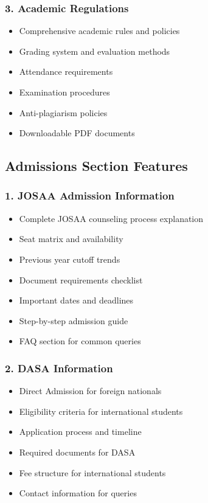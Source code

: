\documentclass[12pt,a4paper]{report}
\begin{document}
\subsubsection*{3. Academic Regulations}
\begin{itemize}
    \item Comprehensive academic rules and policies
    \item Grading system and evaluation methods
    \item Attendance requirements
    \item Examination procedures
    \item Anti-plagiarism policies
    \item Downloadable PDF documents
\end{itemize}

\subsection{Admissions Section Features}

\subsubsection*{1. JOSAA Admission Information}
\begin{itemize}
    \item Complete JOSAA counseling process explanation
    \item Seat matrix and availability
    \item Previous year cutoff trends
    \item Document requirements checklist
    \item Important dates and deadlines
    \item Step-by-step admission guide
    \item FAQ section for common queries
\end{itemize}

\subsubsection*{2. DASA Information}
\begin{itemize}
    \item Direct Admission for foreign nationals
    \item Eligibility criteria for international students
    \item Application process and timeline
    \item Required documents for DASA
    \item Fee structure for international students
    \item Contact information for queries
\end{itemize}
\end{document}
